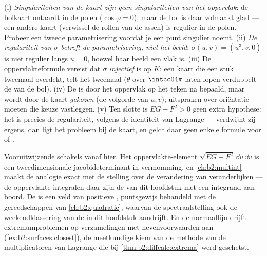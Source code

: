 \begin{remark}
(i) \emph{Singulariteiten van de kaart zijn geen singulariteiten
van het oppervlak}: de bolkaart ontaardt in de polen ($\cos\varphi
= 0$), maar de bol is daar volmaakt glad --- een andere kaart
(verwissel de rollen van de assen) is regulier in de polen. Probeer
een tweede parametrisering voordat je een punt singulier noemt.
(ii) \emph{De regulariteit van $\sigma$ betreft de parametrisering,
niet het beeld}: $\sigma(u, v) = (u^3, v, 0)$ is niet regulier
langs $u = 0$, hoewel haar beeld een vlak is. (iii) De
oppervlakteformule vereist dat $\sigma$ \emph{injectief} is op $K$:
een kaart die een stuk tweemaal overdekt, telt het tweemaal
($\theta$ over $\intcc0{4\pi}$ laten lopen verdubbelt de
 van de bol). (iv) De  is door het
oppervlak op het teken na bepaald, maar wordt door de kaart
\emph{gekozen} (de volgorde van $u, v$); uitspraken over oriëntatie
moeten die keuze vastleggen. (v) Ten slotte is $EG - F^2 > 0$ geen
extra hypothese: het is precies de regulariteit, volgens de
identiteit van Lagrange --- verdwijnt zij ergens, dan ligt het
probleem bij de kaart, en geldt daar geen enkele formule voor
 of .
\end{remark}

\begin{remark}
Vooruitwijzende schakels vanaf hier. Het oppervlakte-element
$\sqrt{EG - F^2}\,\dd u\,\dd v$ is een tweedimensionale
jacobideterminant in vermomming, en \cref{ch:b2:multint} maakt de
analogie exact met de stelling over de verandering van
veranderlijken --- de oppervlakte-integralen daar zijn de
 van dit hoofdstuk met een integrand aan boord. De
 is een veld van positieve , puntsgewijs behandeld met de gereedschappen van
\cref{ch:b2:quadratic}, waarvan de spectraalstelling ook de
weekendklassering van de  in dit hoofdstuk aandrijft. En
de normaallijn drijft extremumproblemen op verzamelingen met
nevenvoorwaarden aan (\cref{ex:b2:surfaces:closest}), de
meetkundige kiem van de methode van de multiplicatoren van Lagrange
die bij \cref{thm:b2:diffcalc:extrema} werd geschetst.
\end{remark}

